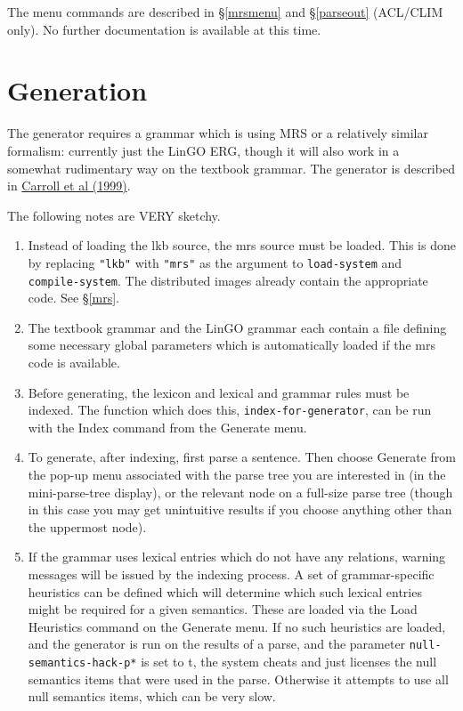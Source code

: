 \documentclass[12pt]{report}
\newcommand{\functionname}[1]{{\tt #1}}
\newcommand{\lkbparam}[1]{{\tt #1}}
\newcommand{\lkbmenucommand}{{\bf}}
\begin{document}
The menu commands are described in \S\ref{mrsmenu} and
\S\ref{parseout} (ACL/CLIM only).
No further documentation is available at this time.

\section{Generation}
\label{generator}

The generator requires a grammar which is using MRS or a relatively
similar formalism: currently just the LinGO ERG, though
it will also work in a somewhat rudimentary way on the
textbook grammar.  The generator is described in 
\href{http://www-csli.stanford.edu/~aac/papers/generation.ps.gz}{Carroll et al (1999)}.

The following notes are VERY sketchy.
\begin{enumerate}
\item Instead of loading the lkb source, the mrs source must be loaded.  This
is done by replacing {\tt "lkb"} with {\tt "mrs"} as the argument to
\functionname{load-system} and \functionname{compile-system}.  
The distributed images
already contain the appropriate code.  See \S\ref{mrs}.
\item The textbook grammar and the LinGO grammar each
contain a file defining some necessary
global parameters which is automatically loaded if the mrs code is available.
\item Before generating, the lexicon and lexical and grammar rules
must be indexed.  The function which does this, 
\functionname{index-for-generator},
can be run with the {\lkbmenucommand Index} command
from the {\lkbmenucommand Generate} menu.
\item To generate, after indexing, first parse a sentence.  
Then choose {\lkbmenucommand Generate} from the
pop-up menu associated with the parse tree you are interested
in (in the mini-parse-tree display), or the relevant node on 
a full-size parse tree (though in this case you may get 
unintuitive results if you choose anything other than the uppermost node).
\item If the grammar uses lexical entries which do not have
any relations, warning messages will be issued by the indexing process.
A set of grammar-specific heuristics can be defined which will determine
which such lexical entries might be required for a given semantics.
These are loaded via the {\lkbmenucommand Load Heuristics} command
on the {\lkbmenucommand Generate} menu.  If no such heuristics are loaded,
and the generator is run on the results of a parse,
and the parameter \lkbparam{*null-semantics-hack-p*} is set to t,
the system cheats and just licenses the null semantics items that were used
in the parse.  Otherwise it attempts to use all
null semantics items, which can be very slow.
\end{enumerate}
\end{document}
